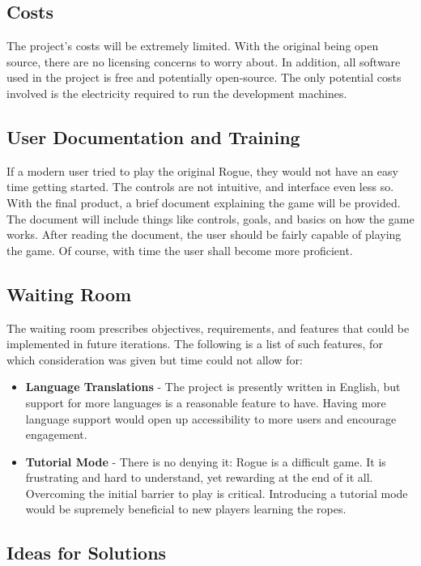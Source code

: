 \documentclass[12pt, titlepage]{article}
\begin{document}
	\subsection{Costs}

		The project's costs will be extremely limited. With the original being open source, there are no licensing concerns to worry about. In addition, all software used in the project is free and potentially open-source. The only potential costs involved is the electricity required to run the development machines.

	\subsection{User Documentation and Training}

		If a modern user tried to play the original Rogue, they would not have an easy time getting started. The controls are not intuitive, and interface even less so. With the final product, a brief document explaining the game will be provided. The document will include things like controls, goals, and basics on how the game works. After reading the document, the user should be fairly capable of playing the game. Of course, with time the user shall become more proficient.

	\subsection{Waiting Room}

		The waiting room prescribes objectives, requirements, and features that could be implemented in future iterations. The following is a list of such features, for which consideration was given but time could not allow for:
		\begin{itemize}
			\item \textbf{Language Translations} - The project is presently written in English, but support for more languages is a reasonable feature to have. Having more language support would open up accessibility to more users and encourage engagement.
			\item \textbf{Tutorial Mode} - There is no denying it: Rogue is a difficult game. It is frustrating and hard to understand, yet rewarding at the end of it all. Overcoming the initial barrier to play is critical. Introducing a tutorial mode would be supremely beneficial to new players learning the ropes.
		\end{itemize}

	\subsection{Ideas for Solutions}
\end{document}
